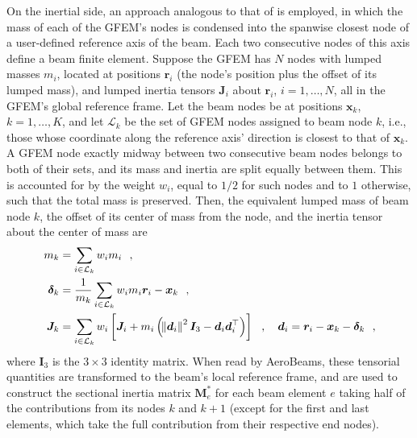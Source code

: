 \documentclass[journal]{new-aiaa}
\newcommand{\vect}[1]{\bm{#1}}
\def\tens#1{\bm{#1}}
\def\lp{\left(}
\def\rp{\right)}
\def\Mass{\mathcal{\tens{M}}^*}
\begin{document}
On the inertial side, an approach analogous to that of \cite{riso2022low} is employed, in which the mass of each of the GFEM's nodes is condensed into the spanwise closest node of a user-defined reference axis of the beam. Each two consecutive nodes of this axis define a beam finite element. Suppose the GFEM has $N$ nodes with lumped masses $m_i$, located at positions $\vect{r}_i$ (the node's position plus the offset of its lumped mass), and lumped inertia tensors $\tens{J}_i$ about $\vect{r}_i$, $i=1,\dots,N$, all in the GFEM's global reference frame. Let the beam nodes be at positions $\vect{x}_k$, $k=1,\dots,K$, and let $\mathcal{L}_k$ be the set of GFEM nodes assigned to beam node $k$, i.e., those whose coordinate along the reference axis' direction is closest to that of $\vect{x}_k$. A GFEM node exactly midway between two consecutive beam nodes belongs to both of their sets, and its mass and inertia are split equally between them. This is accounted for by the weight $w_i$, equal to $1/2$ for such nodes and to $1$ otherwise, such that the total mass is preserved. Then, the equivalent lumped mass of beam node $k$, the offset of its center of mass from the node, and the inertia tensor about the center of mass are
\begin{align}
    m_k &= \sum_{i \in \mathcal{L}_k} w_i m_i \ \ ,
    \\
    \vect{\delta}_k &= \frac{1}{m_k} \sum_{i \in \mathcal{L}_k} w_i m_i \vect{r}_i - \vect{x}_k \ \ ,
    \\
    \tens{J}_k &= \sum_{i \in \mathcal{L}_k} w_i \left[ \tens{J}_i + m_i \lp \norm{\vect{d}_i}^2 \tens{I}_3 - \vect{d}_i \vect{d}_i^\top \rp \right] \ \ , \quad \vect{d}_i = \vect{r}_i - \vect{x}_k - \vect{\delta}_k \ \ ,
\end{align}
where $\tens{I}_3$ is the $3\times 3$ identity matrix. When read by AeroBeams, these tensorial quantities are transformed to the beam's local reference frame, and are used to construct the sectional inertia matrix $\Mass_e$ for each beam element $e$ taking half of the contributions from its nodes $k$ and $k+1$ (except for the first and last elements, which take the full contribution from their respective end nodes).
\end{document}
